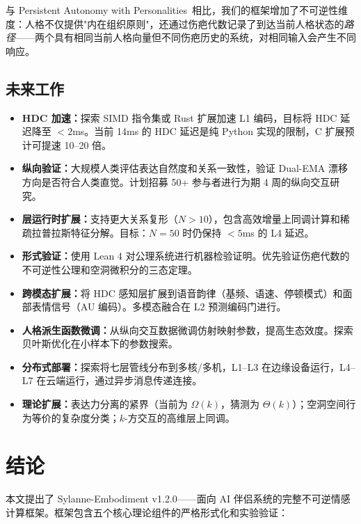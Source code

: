 \documentclass[11pt]{article}
\begin{document}
与 Persistent Autonomy with Personalities~\cite{persistent2026}相比，我们的框架增加了不可逆性维度：人格不仅提供"内在组织原则"，还通过伤疤代数记录了到达当前人格状态的\emph{路径}——两个具有相同当前人格向量但不同伤疤历史的系统，对相同输入会产生不同响应。

\subsection{未来工作}

\begin{itemize}
\item \textbf{HDC 加速：}探索 SIMD 指令集或 Rust 扩展加速 L1 编码，目标将 HDC 延迟降至 $< 2$ms。当前 14ms 的 HDC 延迟是纯 Python 实现的限制，C 扩展预计可提速 10--20 倍。
\item \textbf{纵向验证：}大规模人类评估表达自然度和关系一致性，验证 Dual-EMA 漂移方向是否符合人类直觉。计划招募 50+ 参与者进行为期 4 周的纵向交互研究。
\item \textbf{层运行时扩展：}支持更大关系复形（$N > 10$），包含高效增量上同调计算和稀疏拉普拉斯特征分解。目标：$N = 50$ 时仍保持 $< 5$ms 的 L4 延迟。
\item \textbf{形式验证：}使用 Lean 4 对公理系统进行机器检验证明。优先验证伤疤代数的不可逆性公理和空洞微积分的三态定理。
\item \textbf{跨模态扩展：}将 HDC 感知层扩展到语音韵律（基频、语速、停顿模式）和面部表情信号（AU 编码）。多模态融合在 L2 预测编码门进行。
\item \textbf{人格派生函数微调：}从纵向交互数据微调仿射映射参数，提高生态效度。探索贝叶斯优化在小样本下的参数搜索。
\item \textbf{分布式部署：}探索将七层管线分布到多核/多机，L1--L3 在边缘设备运行，L4--L7 在云端运行，通过异步消息传递连接。
\item \textbf{理论扩展：}表达力分离的紧界（当前为 $\Omega(k)$，猜测为 $\Theta(k)$）；空洞空间行为等价的复杂度分类；$k$-方交互的高维层上同调。
\end{itemize}

\section{结论}
\label{sec:conclusion}

本文提出了 Sylanne-Embodiment v1.2.0——面向 AI 伴侣系统的完整不可逆情感计算框架。框架包含五个核心理论组件的严格形式化和实验验证：
\end{document}

